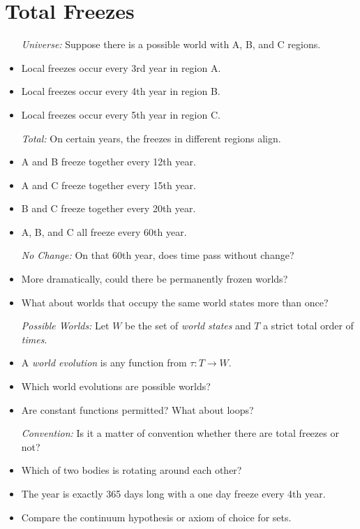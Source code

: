 \documentclass[a4paper, 11pt]{article} %
\begin{document}
\section*{Total Freezes}

\begin{itemize}
  \item[\it Universe:] Suppose there is a possible world with A, B, and C regions.
    \item Local freezes occur every 3rd year in region A.
    \item Local freezes occur every 4th year in region B.
    \item Local freezes occur every 5th year in region C.
  \item[\it Total:] On certain years, the freezes in different regions align.
    \item A and B freeze together every 12th year.
    \item A and C freeze together every 15th year.
    \item B and C freeze together every 20th year.
    \item A, B, and C all freeze every 60th year.
  \item[\it No Change:] On that 60th year, does time pass without change?
    \item More dramatically, could there be permanently frozen worlds?
    \item What about worlds that occupy the same world states more than once?
  \item[\it Possible Worlds:] Let $W$ be the set of \textit{world states} and $T$ a strict total order of \textit{times}. 
    \item A \textit{world evolution} is any function from $\tau : T \to W$.
    \item Which world evolutions are possible worlds? 
    \item Are constant functions permitted? What about loops?
  \item[\it Convention:] Is it a matter of convention whether there are total freezes or not?
    \item Which of two bodies is rotating around each other?
    \item The year is exactly 365 days long with a one day freeze every 4th year.
    \item Compare the continuum hypothesis or axiom of choice for sets.
\end{itemize}
\end{document}

